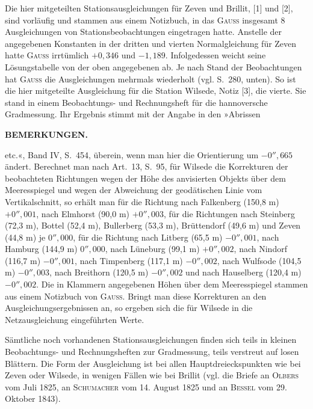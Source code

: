 Die hier mitgeteilten Stationsausgleichungen für Zeven und Brillit, [1] und [2], sind vorläufig und stammen aus einem Notizbuch, in das \textsc{Gauss} insgesamt 8 Ausgleichungen von Stationsbeobachtungen eingetragen hatte. Anstelle der angegebenen Konstanten in der dritten und vierten Normalgleichung für Zeven hatte \textsc{Gauss} irrtümlich \(+0{,}346\) und \(-1{,}189\). Infolgedessen weicht seine Lösungstabelle von der oben angegebenen ab. Je nach Stand der Beobachtungen hat \textsc{Gauss} die Ausgleichungen mehrmals wiederholt (vgl. S.~280, unten). So ist die hier mitgeteilte Ausgleichung für die Station Wilsede, Notiz [3], die vierte. Sie stand in einem Beobachtungs- und Rechnungsheft für die hannoversche Gradmessung. Ihr Ergebnis stimmt mit der Angabe in den »Abrissen

\par\clearpage
\noindent{}\hfill{\small\textbf{BEMERKUNGEN.}}\hfill\null\par\medskip

\noindent etc.«, Band IV, S.~454, überein, wenn man hier die Orientierung um \(-0''{,}665\) ändert. Berechnet man nach Art.~13, S.~95, für Wilsede die Korrekturen der beobachteten Richtungen wegen der Höhe des anvisierten Objekts über dem Meeresspiegel und wegen der Abweichung der geodätischen Linie vom Vertikalschnitt, so erhält man für die Richtung nach Falkenberg (150,8 m) \(+0''{,}001\), nach Elmhorst (90,0 m) \(+0''{,}003\), für die Richtungen nach Steinberg (72,3 m), Bottel (52,4 m), Bullerberg (53,3 m), Brüttendorf (49,6 m) und Zeven (44,8 m) je \(0''{,}000\), für die Richtung nach Litberg (65,5 m) \(-0''{,}001\), nach Hamburg (144,9 m) \(0''{,}000\), nach Lüneburg (99,1 m) \(+0''{,}002\), nach Nindorf (116,7 m) \(-0''{,}001\), nach Timpenberg (117,1 m) \(-0''{,}002\), nach Wulfsode (104,5 m) \(-0''{,}003\), nach Breithorn (120,5 m) \(-0''{,}002\) und nach Hauselberg (120,4 m) \(-0''{,}002\). Die in Klammern angegebenen Höhen über dem Meeresspiegel stammen aus einem Notizbuch von \textsc{Gauss}. Bringt man diese Korrekturen an den Ausgleichungsergebnissen an, so ergeben sich die für Wilsede in die Netzausgleichung eingeführten Werte.

Sämtliche noch vorhandenen Stationsausgleichungen finden sich teils in kleinen Beobachtungs- und Rechnungsheften zur Gradmessung, teils verstreut auf losen Blättern. Die Form der Ausgleichung ist bei allen Hauptdreieckspunkten wie bei Zeven oder Wilsede, in wenigen Fällen wie bei Brillit (vgl. die Briefe an \textsc{Olbers} vom Juli 1825, an \textsc{Schumacher} vom 14. August 1825 und an \textsc{Bessel} vom 29. Oktober 1843).

